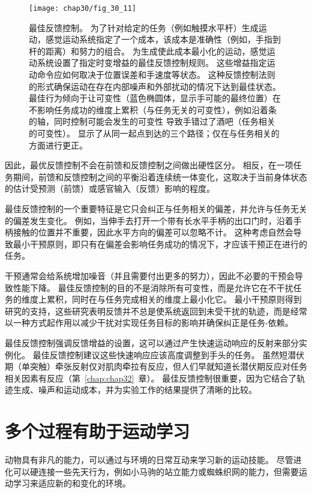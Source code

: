 \begin{figure}[htbp]
	\centering
	\texttt{[image: chap30/fig\_30\_11]}
	\caption{最佳反馈控制。
		为了针对给定的任务（例如触摸水平杆）生成运动，感觉运动系统指定了一个成本，该成本是准确性（例如，手指到杆的距离）和努力的组合。
		为生成使此成本最小化的运动，感觉运动系统设置了指定时变增益的最佳反馈控制规则。
		这些增益指定运动命令应如何取决于位置误差和手速度等状态。
		这种反馈控制法则的形式确保运动在存在内部噪声和外部扰动的情况下达到最佳状态。
		最佳行为倾向于让可变性（蓝色椭圆体，显示手可能的最终位置）在不影响任务成功的维度上累积（与任务无关的可变性），例如沿着条的轴，同时控制可能会发生的可变性 导致手错过了酒吧（任务相关的可变性）。
		显示了从同一起点到达的三个路径；仅在与任务相关的方面进行更正。}
	\label{fig:30_11}
\end{figure}


因此，最优反馈控制不会在前馈和反馈控制之间做出硬性区分。
相反，在一项任务期间，前馈和反馈控制之间的平衡沿着连续统一体变化，这取决于当前身体状态的估计受预测（前馈）或感官输入（反馈）影响的程度。


最佳反馈控制的一个重要特征是它只会纠正与任务相关的偏差，并允许与任务无关的偏差发生变化。
例如，当伸手去打开一个带有长水平手柄的出口门时，沿着手柄接触的位置并不重要，因此水平方向的偏差可以忽略不计。
这种考虑自然会导致最小干预原则，即只有在偏差会影响任务成功的情况下，才应该干预正在进行的任务。


干预通常会给系统增加噪音（并且需要付出更多的努力），因此不必要的干预会导致性能下降。
最佳反馈控制的目的不是消除所有可变性，而是允许它在不干扰任务的维度上累积，同时在与任务完成相关的维度上最小化它。
最小干预原则得到研究的支持，这些研究表明反馈并不总是使系统返回到未受干扰的轨迹，而是经常以一种方式起作用以减少干扰对实现任务目标的影响并确保纠正是任务-依赖。


最佳反馈控制强调反馈增益的设置，这可以通过产生快速运动响应的反射来部分实例化。
最佳反馈控制建议这些快速响应应该高度调整到手头的任务。
虽然短潜伏期（单突触）牵张反射仅对肌肉牵拉有反应，但人们早就知道长潜伏期反应对任务相关因素有反应（第~\ref{chap:chap32}~章）。
最佳反馈控制很重要，因为它结合了轨迹生成、噪声和运动成本，并为实验工作的结果提供了清晰的比较。



\section{多个过程有助于运动学习}

动物具有非凡的能力，可以通过与环境的日常互动来学习新的运动技能。
尽管进化可以硬连接一些先天行为，例如小马驹的站立能力或蜘蛛织网的能力，但需要运动学习来适应新的和变化的环境。


